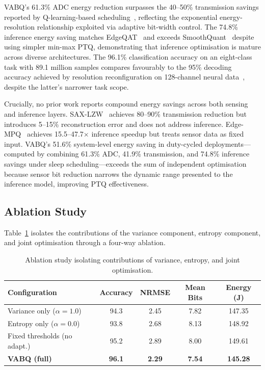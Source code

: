 VABQ's 61.3\% ADC energy reduction surpasses the 40--50\% transmission savings reported by Q-learning-based scheduling~\cite{qlearning2025airquality}, reflecting the exponential energy-resolution relationship exploited via adaptive bit-width control. The 74.8\% inference energy saving matches EdgeQAT~\cite{edgeqat2024} and exceeds SmoothQuant~\cite{smoothquant2024} despite using simpler min-max PTQ, demonstrating that inference optimisation is mature across diverse architectures. The 96.1\% classification accuracy on an eight-class task with 89.1 million samples compares favourably to the 95\% decoding accuracy achieved by resolution reconfiguration on 128-channel neural data~\cite{pandey2025neural}, despite the latter's narrower task scope.

Crucially, no prior work reports compound energy savings across both sensing and inference layers. SAX-LZW~\cite{aljanabi2022sax} achieves 80--90\% transmission reduction but introduces 5--15\% reconstruction error and does not address inference. Edge-MPQ~\cite{edgempq2024} achieves 15.5--47.7$\times$ inference speedup but treats sensor data as fixed input. VABQ's 51.6\% system-level energy saving in duty-cycled deployments---computed by combining 61.3\% ADC, 41.9\% transmission, and 74.8\% inference savings under sleep scheduling---exceeds the sum of independent optimisation because sensor bit reduction narrows the dynamic range presented to the inference model, improving PTQ effectiveness.

\subsection{Ablation Study}
\label{sec:res_ablation}

Table~\ref{tab:ablation} isolates the contributions of the variance component, entropy component, and joint optimisation through a four-way ablation.

\begin{table}[H]
\centering
\caption{Ablation study isolating contributions of variance, entropy, and joint optimisation.}
\label{tab:ablation}
\begin{tabular}{@{}lcccc@{}}
\toprule
\textbf{Configuration} & \textbf{Accuracy} & \textbf{NRMSE} & \textbf{Mean Bits} & \textbf{Energy (J)} \\
\midrule
Variance only ($\alpha=1.0$) & 94.3 & 2.45 & 7.82 & 147.35 \\
Entropy only ($\alpha=0.0$) & 93.8 & 2.68 & 8.13 & 148.92 \\
Fixed thresholds (no adapt.) & 95.2 & 2.89 & 8.00 & 149.61 \\
\textbf{VABQ (full)} & \textbf{96.1} & \textbf{2.29} & \textbf{7.54} & \textbf{145.28} \\
\bottomrule
\end{tabular}
\end{table}

